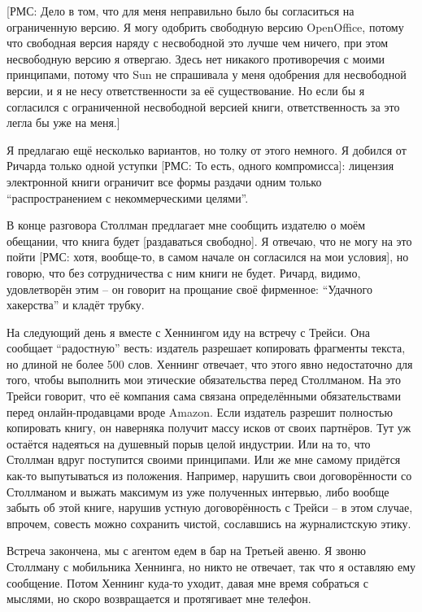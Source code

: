 [РМС: Дело в том, что для меня неправильно было бы согласиться на ограниченную версию. Я могу одобрить свободную версию OpenOffice, потому что свободная версия наряду с несвободной это лучше чем ничего, при этом несвободную версию я отвергаю. Здесь нет никакого противоречия с моими принципами, потому что Sun не спрашивала у меня одобрения для несвободной версии, и я не несу ответственности за её существование. Но если бы я согласился с ограниченной несвободной версией книги, ответственность за это легла бы уже на меня.]

Я предлагаю ещё несколько вариантов, но толку от этого немного. Я добился от Ричарда только одной уступки [РМС: То есть, одного компромисса]: лицензия электронной книги ограничит все формы раздачи одним только ``распространением с некоммерческими целями''.

В конце разговора Столлман предлагает мне сообщить издателю о моём обещании, что книга будет [раздаваться свободно]. Я отвечаю, что не могу на это пойти [РМС: хотя, вообще-то, в самом начале он согласился на мои условия], но говорю, что без сотрудничества с ним книги не будет. Ричард, видимо, удовлетворён этим -- он говорит на прощание своё фирменное: ``Удачного хакерства'' и кладёт трубку.

На следующий день я вместе с Хеннингом иду на встречу с Трейси. Она сообщает ``радостную'' весть: издатель разрешает копировать фрагменты текста, но длиной не более 500 слов. Хеннинг отвечает, что этого явно недостаточно для того, чтобы выполнить мои этические обязательства перед Столлманом. На это Трейси говорит, что её компания сама связана определёнными обязательствами перед онлайн-продавцами вроде Amazon. Если издатель разрешит полностью копировать книгу, он наверняка получит массу исков от своих партнёров. Тут уж остаётся надеяться на душевный порыв целой индустрии. Или на то, что Столлман вдруг поступится своими принципами. Или же мне самому придётся как-то выпутываться из положения. Например, нарушить свои договорённости со Столлманом и выжать максимум из уже полученных интервью, либо вообще забыть об этой книге, нарушив устную договорённость с Трейси -- в этом случае, впрочем, совесть можно сохранить чистой, сославшись на журналистскую этику.

Встреча закончена, мы с агентом едем в бар на Третьей авеню. Я звоню Столлману с мобильника Хеннинга, но никто не отвечает, так что я оставляю ему сообщение. Потом Хеннинг куда-то уходит, давая мне время собраться с мыслями, но скоро возвращается и протягивает мне телефон.

